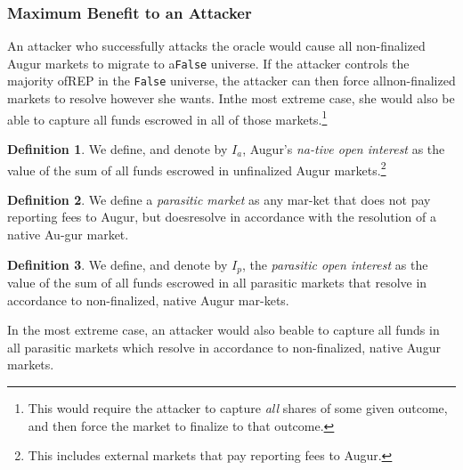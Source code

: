 \documentclass[12pt,floatfix,reprint,nofootinbib,amsmath,amssymb,epsfig,pre,floats,letterpaper,groupedaffiliation]{revtex4-1}
\theoremstyle{definition}
\theoremstyle{definition}
\newtheorem{definition}{Definition}
\begin{document}
\subsubsection{Maximum Benefit to an Attacker}

An attacker who successfully attacks the oracle would cause all non-finalized Augur markets to migrate to a\linebreak \texttt{False} universe. If the attacker controls the majority of\linebreak REP in the \texttt{False} universe, the attacker can then force all\linebreak non-finalized markets to resolve however she wants. In\linebreak the most extreme case, she would also be able to capture all funds escrowed in all of those markets.\footnote{This would require the attacker to capture \textit{all} shares of some given outcome, and then force the market to finalize to that outcome.}

\begin{definition}
We define, and denote by $I_a$, Augur's \textit{na-\linebreak tive open interest} as the value of the sum of all funds escrowed in unfinalized Augur markets.\footnote{This includes external markets that pay reporting fees to Augur.}
\end{definition}

\begin{definition}
We define a \textit{parasitic market} as any mar-\linebreak ket that does not pay reporting fees to Augur, but does\linebreak resolve in accordance with the resolution of a native Au-\linebreak gur market.
\end{definition}

\begin{definition}
We define, and denote by $I_p$, the \textit{parasitic open interest} as the value of the sum of all funds escrowed in all parasitic markets that resolve in accordance to non-finalized, native Augur mar-\linebreak kets.
\end{definition}

In the most extreme case, an attacker would also be\linebreak able to capture all funds in all parasitic markets which resolve in accordance to non-finalized, native Augur markets.
\end{document}
